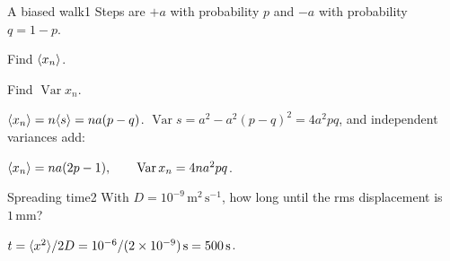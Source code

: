 \documentclass[11pt]{article}
\begin{document}
\makeprobheader
\problemlist

\begin{problem}{A biased walk}{1}
Steps are $+a$ with probability $p$ and $-a$ with probability $q=1-p$.
\begin{parts}
  \item Find $\langle x_n \rangle$.
  \item Find $\operatorname{Var}x_n$.
\end{parts}
\end{problem}
\begin{solution}
 $\langle x_n \rangle=n\langle s \rangle=na(p-q)$.
 $\operatorname{Var}s=a^2-a^2(p-q)^2=4a^2pq$, and independent variances add:
\begin{answer}
$\langle x_n \rangle=na(2p-1),\qquad \operatorname{Var}x_n=4na^2pq$.
\end{answer}
\end{solution}

\begin{problem}{Spreading time}{2}
With $D=10^{-9}\,\mathrm{m^2\,s^{-1}}$, how long until the rms displacement is $1\,\mathrm{mm}$?
\end{problem}
\begin{solution}
$t=\langle x^2 \rangle/2D=10^{-6}/(2\times10^{-9})\,\mathrm s=500\,\mathrm s$.
\end{solution}
\end{document}
